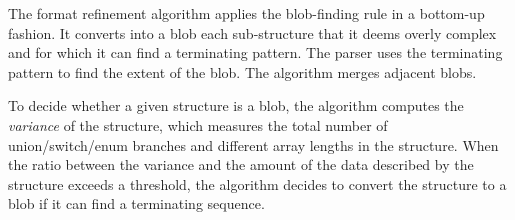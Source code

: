 The format refinement algorithm applies the blob-finding rule 
in a bottom-up fashion. It converts into a blob each sub-structure
that it deems overly complex and for which it can find a terminating pattern. 
The \pads{} parser uses the terminating pattern to
find the extent of the blob. The algorithm merges adjacent blobs.

To decide whether a given structure is a blob, 
the algorithm computes the {\em variance} of the structure, which
measures the total number of union/switch/enum
branches and different array lengths in the 
structure. When the ratio between the variance and the amount of the data
described by the structure exceeds a threshold, the algorithm decides
to convert the structure to a blob if it can find a
terminating sequence.
